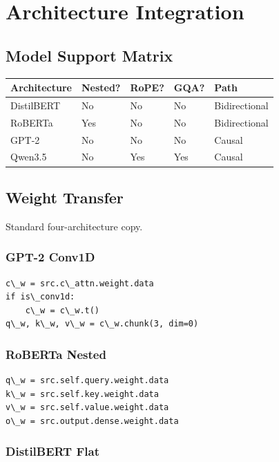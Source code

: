 
\section{Architecture Integration}

\subsection{Model Support Matrix}

\begin{table}[H]
\centering
\small
\begin{tabular}{lllll}
\toprule
\textbf{Architecture} & \textbf{Nested?} & \textbf{RoPE?} & \textbf{GQA?} & \textbf{Path} \\
\midrule
DistilBERT & No & No & No & Bidirectional \\
RoBERTa & Yes & No & No & Bidirectional \\
GPT-2 & No & No & No & Causal \\
Qwen3.5 & No & Yes & Yes & Causal \\
\bottomrule
\end{tabular}
\end{table}

\subsection{Weight Transfer}

Standard four-architecture copy.

\subsubsection{GPT-2 Conv1D}

\begin{lstlisting}
c\_w = src.c\_attn.weight.data
if is\_conv1d:
    c\_w = c\_w.t()
q\_w, k\_w, v\_w = c\_w.chunk(3, dim=0)
\end{lstlisting}

\subsubsection{RoBERTa Nested}

\begin{lstlisting}
q\_w = src.self.query.weight.data
k\_w = src.self.key.weight.data
v\_w = src.self.value.weight.data
o\_w = src.output.dense.weight.data
\end{lstlisting}

\subsubsection{DistilBERT Flat}

